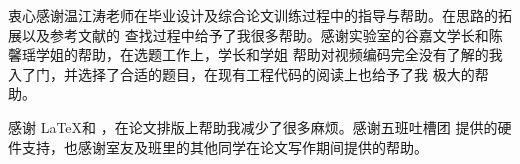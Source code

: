\begin{acknowledgement}
  衷心感谢温江涛老师在毕业设计及综合论文训练过程中的指导与帮助。在思路的拓展以及参考文献的
  查找过程中给予了我很多帮助。感谢实验室的谷嘉文学长和陈馨瑶学姐的帮助，在选题工作上，学长和学姐
  帮助对视频编码完全没有了解的我入了门，并选择了合适的题目，在现有工程代码的阅读上也给予了我
  极大的帮助。

  感谢 \LaTeX 和 \thuthesis\cite{thuthesis}，在论文排版上帮助我减少了很多麻烦。感谢五班吐槽团
  提供的硬件支持，也感谢室友及班里的其他同学在论文写作期间提供的帮助。
  
\end{acknowledgement}
